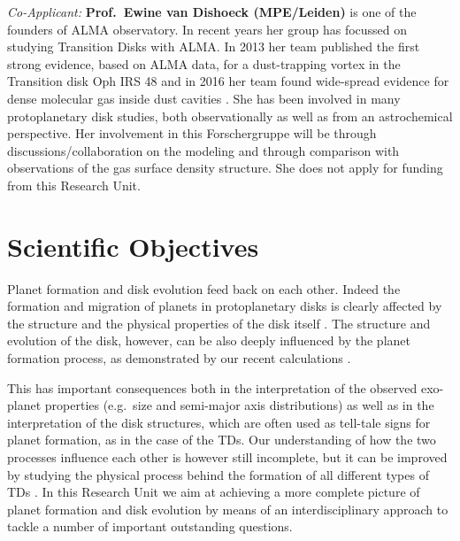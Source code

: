 \documentclass[10pt,fleqn,twoside,a4paper]{article}
\begin{document}
{\it Co-Applicant:} {\bf Prof.\ Ewine van Dishoeck (MPE/Leiden)}
is one of the founders of ALMA observatory. In recent years her group
has focussed on studying Transition Disks with ALMA. In 2013 her team
published the first strong evidence, based on ALMA data, for a
dust-trapping vortex in the Transition disk Oph IRS 48 \citep{2013Sci...340.1199V}
and in 2016 her team found wide-spread
 evidence for dense molecular gas inside dust cavities \citep{2016A&A...585A..58V}. 
She has been
involved in many protoplanetary disk studies, both observationally as
well as from an astrochemical perspective. Her involvement in this Forschergruppe
will be through discussions/collaboration on the modeling and through comparison with
 observations of the gas surface density structure. She does not apply for 
funding from this Research Unit.\\


\section{Scientific Objectives}

Planet formation and disk evolution feed back on each other. Indeed
the formation and migration of planets in protoplanetary disks is
clearly affected by the structure and the physical properties of the
disk itself \citep[e.g.][to cite only a few of the works coming from our team]{2016arXiv161101070D, 2015MNRAS.450.3008E}. 
The
structure and evolution of the disk, however, can be also deeply
influenced by the planet formation process, as demonstrated by our
recent calculations \citep[e.g.,][]{2013MNRAS.430.1392R, 2015MNRAS.454.2173R}.

This has important consequences both in the interpretation of the observed
exo-planet properties (e.g.\ size and semi-major axis distributions) as
well as in the interpretation of the disk structures, which are often
used as tell-tale signs for planet formation, as in the case of the
TDs. Our understanding of how the two processes
influence each other is however still incomplete, but it can be
improved by studying the physical process behind the formation of all
different types of TDs . 
In this Research Unit we aim at achieving a more complete picture of
planet formation and disk evolution by means of an interdisciplinary
approach to tackle a number of important outstanding questions. 
\\
\end{document}
